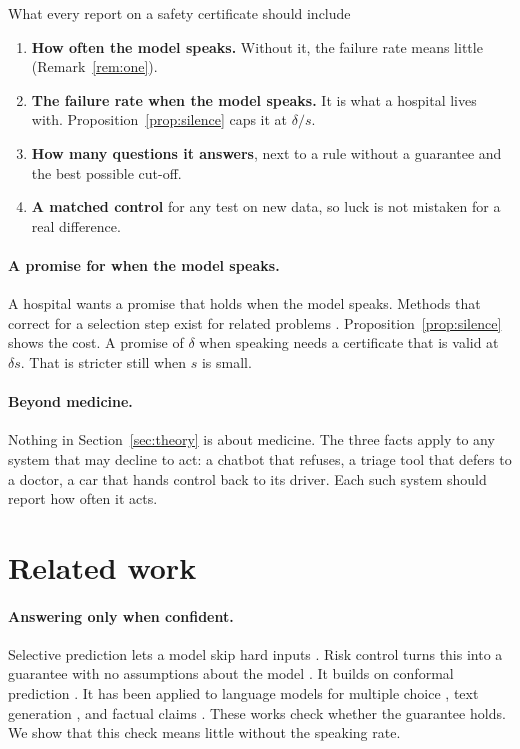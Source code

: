 \documentclass[11pt]{article}
\theoremstyle{plain}
\theoremstyle{definition}
\begin{document}
\begin{plainbox}{What every report on a safety certificate should include}
\begin{enumerate}[leftmargin=1.3em,label=\textbf{\arabic*.}]
    \item \textbf{How often the model speaks.} Without it, the failure rate means little (Remark~\ref{rem:one}).
    \item \textbf{The failure rate when the model speaks.} It is what a hospital lives with. Proposition~\ref{prop:silence} caps it at $\delta/s$.
    \item \textbf{How many questions it answers}, next to a rule without a guarantee and the best possible cut-off.
    \item \textbf{A matched control} for any test on new data, so luck is not mistaken for a real difference.
\end{enumerate}
\end{plainbox}

\paragraph{A promise for when the model speaks.} A hospital wants a promise that holds when the model speaks. Methods that correct for a selection step exist for related problems \citep{jin2023selection,bao2024selective}. Proposition~\ref{prop:silence} shows the cost. A promise of $\delta$ when speaking needs a certificate that is valid at $\delta s$. That is stricter still when $s$ is small.

\paragraph{Beyond medicine.} Nothing in Section~\ref{sec:theory} is about medicine. The three facts apply to any system that may decline to act: a chatbot that refuses, a triage tool that defers to a doctor, a car that hands control back to its driver. Each such system should report how often it acts.

\section{Related work}

\paragraph{Answering only when confident.} Selective prediction lets a model skip hard inputs \citep{el2010foundations,geifman2017selective}. Risk control turns this into a guarantee with no assumptions about the model \citep{bates2021distribution,angelopoulos2022ltt}. It builds on conformal prediction \citep{vovk2005algorithmic,angelopoulos2023conformal}. It has been applied to language models for multiple choice \citep{kumar2023conformal}, text generation \citep{quach2024conformal}, and factual claims \citep{mohri2024factuality}. These works check whether the guarantee holds. We show that this check means little without the speaking rate.
\end{document}
